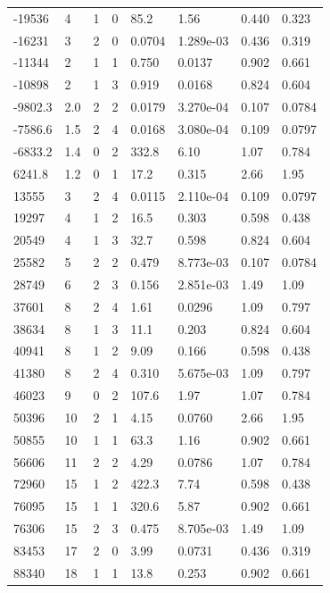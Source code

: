 \documentclass[preview]{standalone}
\begin{document}
{{\begin{tabular}{L{1.2cm}C{1.2cm} C{0.3cm}C{0.5cm} C{1.4cm}C{1.4cm} C{1.4cm}C{1.4cm}}
  -19536  &     4  & 1     &  0 &  85.2  & 1.56  & 0.440 &  0.323   \\ 
  -16231  &     3  & 2     &  0 &  0.0704  & 1.289e-03  & 0.436 &  0.319   \\ 
  -11344  &     2  & 1     &  1 &  0.750  & 0.0137  & 0.902 &  0.661   \\ 
  -10898  &     2  & 1     &  3 &  0.919  & 0.0168  & 0.824 &  0.604   \\ 
  -9802.3  &   2.0  & 2     &  2 &  0.0179  & 3.270e-04  & 0.107 &  0.0784   \\ 
  -7586.6  &   1.5  & 2     &  4 &  0.0168  & 3.080e-04  & 0.109 &  0.0797   \\ 
  -6833.2  &   1.4  & 0     &  2 &  332.8  & 6.10  & 1.07 &  0.784   \\ 
  6241.8  &   1.2  & 0     &  1 &  17.2  & 0.315  & 2.66 &  1.95   \\ 
  13555  &     3  & 2     &  4 &  0.0115  & 2.110e-04  & 0.109 &  0.0797   \\ 
  19297  &     4  & 1     &  2 &  16.5  & 0.303  & 0.598 &  0.438   \\ 
  20549  &     4  & 1     &  3 &  32.7  & 0.598  & 0.824 &  0.604   \\ 
  25582  &     5  & 2     &  2 &  0.479  & 8.773e-03  & 0.107 &  0.0784   \\ 
  28749  &     6  & 2     &  3 &  0.156  & 2.851e-03  & 1.49 &  1.09   \\ 
  37601  &     8  & 2     &  4 &  1.61  & 0.0296  & 1.09 &  0.797   \\ 
  38634  &     8  & 1     &  3 &  11.1  & 0.203  & 0.824 &  0.604   \\ 
  40941  &     8  & 1     &  2 &  9.09  & 0.166  & 0.598 &  0.438   \\ 
  41380  &     8  & 2     &  4 &  0.310  & 5.675e-03  & 1.09 &  0.797   \\ 
  46023  &     9  & 0     &  2 &  107.6  & 1.97  & 1.07 &  0.784   \\ 
  50396  &    10  & 2     &  1 &  4.15  & 0.0760  & 2.66 &  1.95   \\ 
  50855  &    10  & 1     &  1 &  63.3  & 1.16  & 0.902 &  0.661   \\ 
  56606  &    11  & 2     &  2 &  4.29  & 0.0786  & 1.07 &  0.784   \\ 
  72960  &    15  & 1     &  2 &  422.3  & 7.74  & 0.598 &  0.438   \\ 
  76095  &    15  & 1     &  1 &  320.6  & 5.87  & 0.902 &  0.661   \\ 
  76306  &    15  & 2     &  3 &  0.475  & 8.705e-03  & 1.49 &  1.09   \\ 
  83453  &    17  & 2     &  0 &  3.99  & 0.0731  & 0.436 &  0.319   \\ 
  88340  &    18  & 1     &  1 &  13.8  & 0.253  & 0.902 &  0.661   \\ 
\hline 
\end{tabular} 

}}
\end{document}

